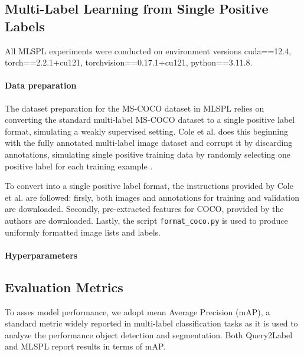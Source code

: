 \documentclass[lettersize,journal]{IEEEtran}
\begin{document}
\subsection{Multi-Label Learning from Single Positive Labels}
All MLSPL experiments were conducted on environment versions cuda==12.4, torch==2.2.1+cu121, torchvision==0.17.1+cu121, python==3.11.8.
\paragraph{Data preparation}
The dataset preparation for the MS-COCO dataset in MLSPL relies on converting the standard multi-label MS-COCO dataset to a single positive label format, simulating a weakly supervised setting. Cole et al. does this beginning with the fully annotated multi-label image dataset and corrupt it by discarding annotations, simulating single positive training data by randomly selecting one positive label for each training example \cite{mlsp}.

To convert into a single positive label format, the instructions provided by Cole et al. are followed: firsly, both images and annotations for training and validation are downloaded. Secondly, pre-extracted features for COCO, provided by the authors are downloaded. Lastly, the script \texttt{format\_coco.py} is used to produce uniformly formatted image lists and labels.

\paragraph{Hyperparameters}

\subsection{Evaluation Metrics}
To asses model performance, we adopt mean Average Precision (mAP), a standard metric widely reported in multi-label classification tasks as it is used to analyze the performance object detection and segmentation. Both Query2Label and MLSPL report results in terms of mAP. 

\end{document}
